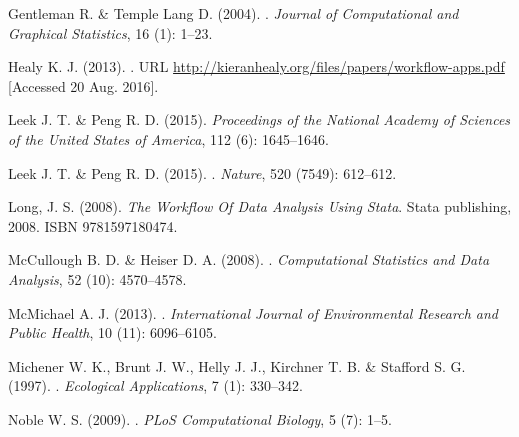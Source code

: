\documentclass[11pt,a4paper]{article}
\begin{document}
\begin{thebibliography}{30}
Gentleman R. \& {Temple Lang} D. (2004).
.
\newblock \emph{Journal of Computational and Graphical Statistics}, 16
  (1): 1--23.


Healy K. J. (2013).
.
\newblock URL \url{http://kieranhealy.org/files/papers/workflow-apps.pdf} [Accessed 20 Aug. 2016].

Leek J. T. \& Peng R. D. (2015{}).
\newblock \emph{Proceedings of the National Academy of Sciences of the United
  States of America}, 112 (6): 1645--1646.


Leek J. T. \& Peng R. D. (2015{}).
.
\newblock \emph{Nature}, 520 (7549): 612--612.


Long, J. S. (2008).
\newblock \emph{{The Workflow Of Data Analysis Using Stata}}.
\newblock Stata publishing, 2008.
\newblock ISBN 9781597180474.

McCullough B. D. \& Heiser D. A. (2008).
.
\newblock \emph{Computational Statistics and Data Analysis}, 52
  (10): 4570--4578.


McMichael A. J. (2013).
.
\newblock \emph{International Journal of Environmental Research and Public
  Health}, 10 (11): 6096--6105.

Michener W. K., Brunt J. W., Helly J. J., Kirchner T. B. \&
  Stafford S. G. (1997).
.
\newblock \emph{Ecological Applications}, 7 (1): 330--342.

Noble W. S. (2009).
.
\newblock \emph{PLoS Computational Biology}, 5 (7): 1--5.



\end{thebibliography}
\end{document}
